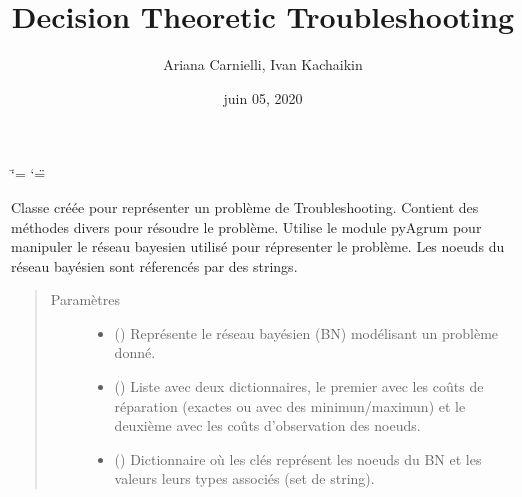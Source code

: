 \documentclass[letterpaper,10pt,french]{sphinxmanual}
\title{Decision Theoretic Troubleshooting}
\date{juin 05, 2020}
\author{Ariana Carnielli, Ivan Kachaikin}
\begin{document}
\ifdefined\shorthandoff
  \ifnum\catcode`\=\string=\active\shorthandoff{=}\fi
  \ifnum\catcode`\"=\active{}\fi
\fi

\pagestyle{empty}
\sphinxmaketitle
\pagestyle{plain}
\sphinxtableofcontents
\pagestyle{normal}
\label{\detokenize{index::doc}}


\begin{fulllineitems}
\label{\detokenize{index:DecisionTheoreticTroubleshooting.TroubleShootingProblem}}
Classe créée pour représenter un problème de Troubleshooting.
Contient des méthodes divers pour résoudre le problème.
Utilise le module pyAgrum pour manipuler le réseau bayesien utilisé pour
répresenter le problème.
Les noeuds du réseau bayésien sont réferencés par des strings.
\begin{quote}\begin{description}
\item[{Paramètres}] \leavevmode\begin{itemize}
\item {} 
 () \textendash{} Représente le réseau bayésien (BN) modélisant un problème donné.

\item {} 
 (\sphinxstyleliteralemphasis{\sphinxupquote{(}}\sphinxstyleliteralemphasis{\sphinxupquote{)}}) \textendash{} Liste avec deux dictionnaires, le premier avec les coûts de
réparation (exactes ou avec des minimun/maximun) et le deuxième
avec les coûts d’observation des noeuds.

\item {} 
 () \textendash{} Dictionnaire où les clés représent les noeuds du BN
et les valeurs leurs types associés (set de string).


\end{itemize}
\end{description}
\end{quote}
\end{fulllineitems}
\end{document}
